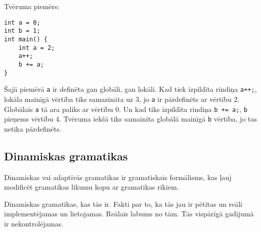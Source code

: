 Tvēruma piemērs:
\begin{verbatim}
int a = 0;
int b = 1;
int main() {
    int a = 2;
    a++;
    b += a;
}
\end{verbatim}
Šajā piemērā \verb|a| ir definēta gan globāli, gan lokāli. Kad tiek izpildīta rindiņa \verb|a++;|, lokāla mainīgā vērtība tiks samazināta uz 3, jo \verb|a| ir pārdefinēts ar vērtību 2. Globālais \verb|a| tā ara paliks ar vērtību 0. Un kad tiks izpildīta rindiņa \verb|b += a;|, \verb|b| pieņems vērtību 4. Tvēruma iekšā tiks samainīta globālā mainīgā \verb|b| vērtība, jo tas netika pārdefinēts.

\subsection{\label{subsec:dynamicgrammars}Dinamiskas gramatikas}
Dinamiskas vai adaptīvās gramatikas ir gramatiskais formālisms, kas ļauj modificēt gramatikas likumu kopu ar gramatikas rīkiem. \cite{Shutt:AdaptiveGrammars}

Dinamiskas gramatikas, kas tās ir. Fakti par to, ka tās jau ir pētītas un reāli implementējamas un lietojamas. Reālais labums no tām.
 Tās vispārīgā gadījumā ir nekontrolējamas.
